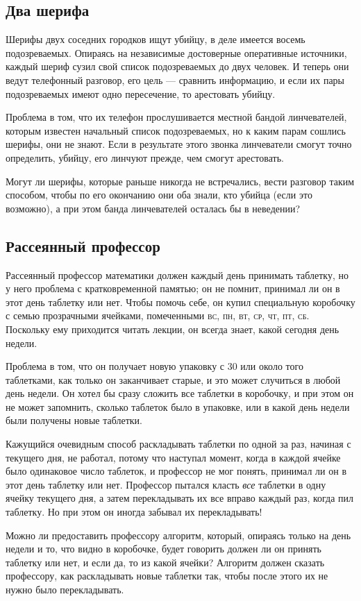 \subsection*{Два шерифа}%

Шерифы двух соседних городков ищут убийцу, в деле имеется восемь подозреваемых.
Опираясь на независимые достоверные оперативные источники, каждый шериф сузил свой список подозреваемых до двух человек.
И теперь они ведут телефонный разговор, его цель --- сравнить информацию, и если их пары подозреваемых имеют одно пересечение, то арестовать убийцу.

Проблема в том, что их телефон прослушивается местной бандой линчевателей, которым известен начальный список подозреваемых, но к каким парам сошлись шерифы, они не знают.
Если в результате этого звонка линчеватели смогут точно определить, убийцу, его линчуют прежде, чем смогут арестовать.

Могут ли шерифы, которые раньше никогда не встречались, вести разговор таким способом, чтобы по его окончанию они оба знали, кто убийца (если это возможно), а при этом банда линчевателей осталась бы в неведении?

\subsection*{Рассеянный профессор}%

Рассеянный профессор математики должен каждый день принимать таблетку, но у него проблема с кратковременной памятью; он не помнит, принимал ли он в этот день таблетку или нет.
Чтобы помочь себе, он купил специальную коробочку с семью прозрачными ячейками, помеченными \textsc{вс}, \textsc{пн}, \textsc{вт}, \textsc{ср}, \textsc{чт}, \textsc{пт}, \textsc{сб}.
Поскольку ему приходится читать лекции, он всегда знает, какой сегодня день недели.

Проблема в том, что он получает новую упаковку с 30 или около того таблетками, как только он заканчивает старые, и это может случиться в любой день недели.
Он хотел бы сразу сложить все таблетки в коробочку, и при этом он не может запомнить, сколько таблеток было в упаковке, или в какой день недели были получены новые таблетки.

Кажущийся очевидным способ раскладывать таблетки по одной за раз, начиная с текущего дня, не работал, потому что наступал момент, когда в каждой ячейке было одинаковое число таблеток, и профессор не мог понять, принимал ли он в этот день таблетку или нет.
Профессор пытался класть \emph{все} таблетки в одну ячейку текущего дня, а затем перекладывать их все вправо каждый раз, когда пил таблетку.
Но при этом он иногда забывал их перекладывать!

Можно ли предоставить профессору алгоритм, который, опираясь только на день недели и то, что видно в коробочке,  будет говорить должен ли он принять таблетку или нет, и если да, то из какой ячейки?
Алгоритм должен сказать профессору, как раскладывать новые таблетки
так, чтобы после этого их не нужно было перекладывать.
